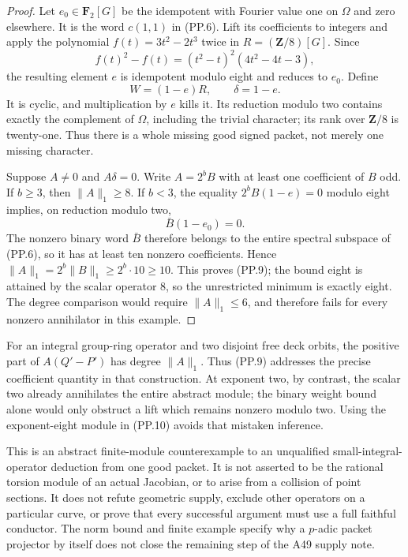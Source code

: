 \begin{proof}
Let $e_0\in\mathbf F_2[G]$ be the idempotent with Fourier
value one on $\Omega$ and zero elsewhere. It is the word
$c(1,1)$ in (PP.6). Lift its coefficients to integers and
apply the polynomial $f(t)=3t^2-2t^3$ twice in
$R=(\mathbf Z/8)[G]$. Since
\[
 f(t)^2-f(t)=(t^2-t)^2(4t^2-4t-3),
\]
the resulting element $e$ is idempotent modulo eight and
reduces to $e_0$. Define
\[
                        W=(1-e)R,\qquad\delta=1-e.
 \tag{PP.10}
\]
It is cyclic, and multiplication by $e$ kills it. Its reduction
modulo two contains exactly the complement of $\Omega$,
including the trivial character; its rank over $\mathbf Z/8$
is twenty-one. Thus there is a whole missing good signed
packet, not merely one missing character.

Suppose $A\ne0$ and $A\delta=0$.
Write $A=2^bB$ with at least one coefficient of $B$ odd.
If $b\ge3$, then $\|A\|_1\ge8$.
If $b<3$, the equality
$2^bB(1-e)=0$ modulo eight implies, on reduction modulo two,
\[
                         \bar B(1-e_0)=0.
\]
The nonzero binary word $\bar B$ therefore belongs to the
entire spectral subspace of (PP.6), so it has at least ten
nonzero coefficients. Hence
$\|A\|_1=2^b\|B\|_1\ge2^b\cdot10\ge10$.
This proves (PP.9); the bound eight is attained by the scalar
operator $8$, so the unrestricted minimum is exactly eight.
The degree comparison would require $\|A\|_1\le6$, and
therefore fails for every nonzero annihilator in this example.
\end{proof}

For an integral group-ring operator and two disjoint free
deck orbits, the positive part of $A(Q'-P')$ has degree
$\|A\|_1$. Thus (PP.9) addresses the precise coefficient
quantity in that construction. At exponent two, by contrast,
the scalar two already annihilates the entire abstract module;
the binary weight bound alone would only obstruct a lift
which remains nonzero modulo two. Using the exponent-eight
module in (PP.10) avoids that mistaken inference.

This is an abstract finite-module counterexample to an
unqualified small-integral-operator deduction from one good
packet. It is not asserted to be the rational torsion module
of an actual Jacobian, or to arise from a collision of point
sections. It does not refute geometric supply, exclude other
operators on a particular curve, or prove that every successful
argument must use a full faithful conductor. The norm bound
and finite example specify why a $p$-adic packet projector by
itself does not close the remaining step of the A49 supply note.
